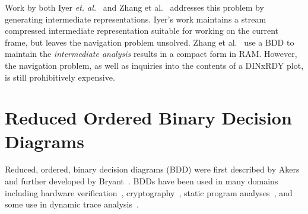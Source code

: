 \documentclass[defaultstyle,11pt]{thesis}
\begin{document}
Work by both Iyer \textit{et. al.}~\cite{iyer:05:epic} and Zhang et
al.~\cite{zhang:04:icse} addresses this problem by generating
intermediate representations. Iyer's work maintains a stream
compressed intermediate representation suitable for working on the
current frame, but leaves the navigation problem unsolved.  Zhang et
al.~\cite{zhang:04:icse} use a BDD to maintain the \textit{intermediate
  analysis} results in a compact form in RAM. However, the navigation
problem, as well as inquiries into the contents of a DINxRDY plot, is
still prohibitively expensive.

\section{Reduced Ordered Binary Decision Diagrams}
\label{sec:robdds}

Reduced, ordered, binary decision diagrams (BDD) were first described
by Akers~\cite{akers:78:itc} and further developed by
Bryant~\cite{bryant:86:ieeetc}.  BDDs have been used in many domains
including hardware verification~\cite{brayton:96:cav},
cryptography~\cite{krause:02:ec}, static program
analyses~\cite{whaley:05:pods,whaley:04:pldi}, and some use in dynamic
trace analysis~\cite{zhang:04:icse}.
\end{document}
